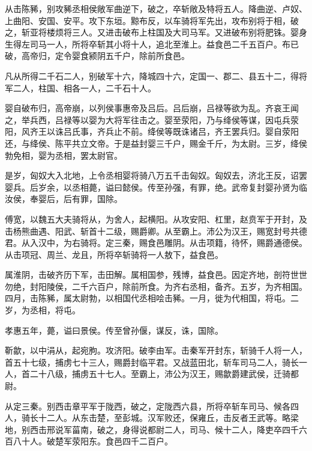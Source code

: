 \documentclass[12pt,UTF8]{ctexbook}
\begin{document}
从击陈豨，别攻豨丞相侯敞军曲逆下，破之，卒斩敞及特将五人。降曲逆、卢奴、上曲阳、安国、安平。攻下东垣。黥布反，以车骑将军先出，攻布别将于相，破之，斩亚将楼烦将三人。又进击破布上柱国及大司马军。又进破布别将肥铢。婴身生得左司马一人，所将卒斩其小将十人，追北至淮上。益食邑二千五百户。布已破，高帝归，定令婴食颍阴五千户，除前所食邑。



凡从所得二千石二人，别破军十六，降城四十六，定国一、郡二、县五十二，得将军二人，柱国、相各一人，二千石十人。



婴自破布归，高帝崩，以列侯事惠帝及吕后。吕后崩，吕禄等欲为乱。齐哀王闻之，举兵西，吕禄等以婴为大将军往击之。婴至荥阳，乃与绛侯等谋，因屯兵荥阳，风齐王以诛吕氏事，齐兵止不前。绛侯等既诛诸吕，齐王罢兵归。婴自荥阳还，与绛侯、陈平共立文帝。于是益封婴三千户，赐金千斤，为太尉。三岁，绛侯勃免相，婴为丞相，罢太尉官。



是岁，匈奴大入北地，上令丞相婴将骑八万五千击匈奴。匈奴去，济北王反，诏罢婴兵。后岁余，以丞相薨，谥曰懿侯。传至孙强，有罪，绝。武帝复封婴孙贤为临汝侯，奉婴后，后有罪，国除。



傅宽，以魏五大夫骑将从，为舍人，起横阳。从攻安阳、杠里，赵贲军于开封，及击杨熊曲遇、阳武、斩首十二级，赐爵卿。从至霸上。沛公为汉王，赐宽封号共德君。从入汉中，为右骑将。定三秦，赐食邑雕阴。从击项籍，待怀，赐爵通德侯。从击项冠、周兰、龙且，所将卒斩骑将一人敖下，益食邑。



属淮阴，击破齐历下军，击田解。属相国参，残博，益食邑。因定齐地，剖符世世勿绝，封阳陵侯，二千六百户，除前所食。为齐右丞相，备齐。五岁，为齐相国。四月，击陈豨，属太尉勃，以相国代丞相哙击豨。一月，徙为代相国，将屯。二岁，为丞相，将屯。



孝惠五年，薨，谥曰景侯。传至曾孙偃，谋反，诛，国除。



靳歙，以中涓从，起宛朐。攻济阳。破李由军。击秦军开封东，斩骑千人将一人，首五十七级，捕虏七十三人，赐爵封临平君。又战蓝田北，斩车司马二人，骑长一人，首二十八级，捕虏五十七人。至霸上，沛公为汉王，赐歙爵建武侯，迁骑都尉。



从定三秦。别西击章平军于陇西，破之，定陇西六县，所将卒斩车司马、候各四人，骑长十二人。从东击楚，至彭城。汉军败还，保雍丘，击反者王武等。略梁地，别西击邢说军菑南，破之，身得说都尉二人，司马、候十二人，降吏卒四千六百八十人。破楚军荥阳东。食邑四千二百户。
\end{document}
